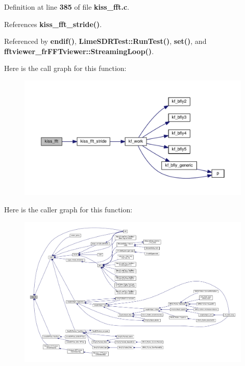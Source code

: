 Definition at line {\bf 385} of file {\bf kiss\+\_\+fft.\+c}.



References {\bf kiss\+\_\+fft\+\_\+stride()}.



Referenced by {\bf endif()}, {\bf Lime\+S\+D\+R\+Test\+::\+Run\+Test()}, {\bf set()}, and {\bf fftviewer\+\_\+fr\+F\+F\+Tviewer\+::\+Streaming\+Loop()}.



Here is the call graph for this function\+:
\nopagebreak
\begin{figure}[H]
\begin{center}
\leavevmode
\includegraphics[width=350pt]{d0/dc9/kiss__fft_8h_ab36e2bb33b74c1a7eabe3271d0916030_cgraph}
\end{center}
\end{figure}




Here is the caller graph for this function\+:
\nopagebreak
\begin{figure}[H]
\begin{center}
\leavevmode
\includegraphics[width=350pt]{d0/dc9/kiss__fft_8h_ab36e2bb33b74c1a7eabe3271d0916030_icgraph}
\end{center}
\end{figure}


